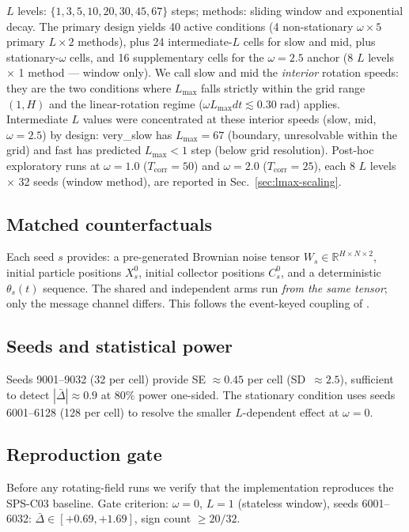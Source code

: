 \documentclass[sigconf,anonymous]{aamas}
\newcommand{\Dbar}{\bar{\Delta}}
\newcommand{\Lmax}{L_{\max}}
\newcommand{\Tcorr}{T_{\mathrm{corr}}}
\begin{document}
\smallskip\noindent
$L$ levels: $\{1, 3, 5, 10, 20, 30, 45, 67\}$ steps; methods:
sliding window and exponential decay.
The primary design yields 40 active conditions (4 non-stationary
$\omega \times 5$ primary $L \times 2$ methods), plus 24
intermediate-$L$ cells for slow and mid, plus stationary-$\omega$
cells, and 16 supplementary cells for the $\omega{=}2.5$ anchor
(8 $L$ levels $\times$ 1 method — window only).
We call slow and mid the \emph{interior} rotation speeds: they are
the two conditions where $\Lmax$ falls strictly within the grid
range $(1, H)$ and the linear-rotation regime ($\omega\Lmax dt
\lesssim 0.30\;\text{rad}$) applies.  Intermediate $L$ values were
concentrated at these interior speeds (slow, mid, $\omega{=}2.5$) by
design: very\_slow has $\Lmax{=}67$ (boundary, unresolvable within
the grid) and fast has predicted $\Lmax{<}1$ step (below grid
resolution).
Post-hoc exploratory runs at $\omega{=}1.0$ ($\Tcorr{=}50$) and
$\omega{=}2.0$ ($\Tcorr{=}25$), each 8 $L$ levels $\times$ 32 seeds
(window method), are reported in Sec.~\ref{sec:lmax-scaling}.

\subsection{Matched counterfactuals}

Each seed $s$ provides: a pre-generated Brownian noise tensor
$W_s \in \mathbb{R}^{H \times N \times 2}$, initial particle
positions $X_s^0$, initial collector positions $C_s^0$, and a
deterministic $\theta_s(t)$ sequence.  The shared and independent
arms run \emph{from the same tensor}; only the message channel
differs.  This follows the event-keyed coupling of
\citet{buffalo2026ekhash}.

\subsection{Seeds and statistical power}

Seeds 9001--9032 (32 per cell) provide SE $\approx 0.45$ per cell
(SD~$\approx 2.5$), sufficient to detect $|\Dbar| \approx 0.9$
at 80\% power one-sided.  The stationary condition uses seeds
6001--6128 (128 per cell) to resolve the smaller $L$-dependent
effect at $\omega{=}0$.

\subsection{Reproduction gate}

Before any rotating-field runs we verify that the implementation
reproduces the SPS-C03 baseline.  Gate criterion:
$\omega{=}0$, $L{=}1$ (stateless window), seeds 6001--6032:
$\Dbar \in [+0.69, +1.69]$, sign count $\geq 20/32$.
\end{document}
